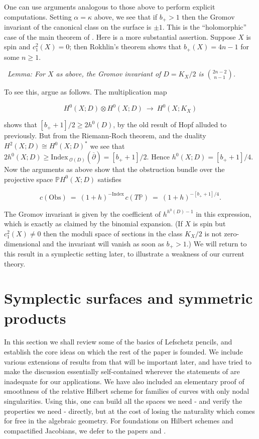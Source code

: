 \documentclass[10pt]{article}
\newcommand{\pp}{\mathbb{P}}
\newcommand{\cdbar}{\overline{\partial}}
\newcommand{\ind}{\mathrm{Index \,}}
\newcounter{Universal}[section]
\renewcommand{\theUniversal}{\thesection.\arabic{Universal}}
\newenvironment{Italic}{\refstepcounter{Universal} \par \vspace{0.5cm}
\noindent {\bf (\theUniversal)}\ \it}{\par \vspace{0.5cm}}
\newenvironment{Lem}{\begin{Italic}{\sc Lemma: }}{\end{Italic}}
\begin{document}
\noindent One can use arguments analogous to those above to perform
explicit computations.  Setting $\alpha = \kappa$ above, we see that
if $b_+ > 1$ then the Gromov
invariant of the canonical class on the surface is $\pm 1$.  This is
the ``holomorphic'' case of the main theorem of \cite{SKDIS}.  Here is a
more substantial assertion.
Suppose $X$ is spin and $c_1 ^2 (X) = 0$; then Rokhlin's theorem shows
that $b_+ (X) = 4n-1$ for some $n \geq 1$.  

\begin{Lem}
For $X$ as above, the Gromov invariant of $D = K_X / 2$ is
  ${{2n-2} \choose {n-1}}$.
\end{Lem}

\noindent To see this, argue as follows. The multiplication map 

$$H^0 (X; D) \otimes H^0 (X; D) \ \rightarrow \ H^0 (X; K_X)$$

\noindent shows that $[b_+ +1]/2 \geq 2h^0 (D)$, by the old result of
Hopf alluded to previously.  But from the Riemann-Roch
theorem, and the duality $H^2 (X;D) \cong H^0 (X;D)^*$ we see that
$2h^0 (X; D) \geq \ind_{\mathcal{O}(D)} (\cdbar) = [b_+ + 1]/2$.
Hence $h^0 (X;D) = [b_+ + 1]/4$.  Now the arguments as above show that 
the obstruction bundle over the projective space $\pp H^0 (X; D)$ satisfies

$$c(\mathrm{Obs}) \ = \ (1+h)^{-\ind} c(T \pp) \ = \ (1+h)^{-[b_+ + 1]/4}.$$

\noindent The Gromov invariant is given by the coefficient of $h^{h^0
  (D) - 1}$ in this expression, which is exactly as claimed by the binomial
  expansion.  (If $X$ is spin but $c_1 ^2 (X) \neq 0$ then the moduli
  space of sections in the class $K_X / 2$ is not zero-dimensional and
  the invariant will vanish as soon as $b_+ > 1$.)  We will return to
  this result in a symplectic setting later, to illustrate a weakness
  of our current theory.



\section{Symplectic surfaces and symmetric products}

In this section we shall review some of the basics of Lefschetz pencils,
and establish the core ideas on which the rest of
the paper is founded.  We include various extensions of results 
from \cite{SKDIS} that will be important later, and have tried to make
the discussion essentially self-contained wherever the statements of
\cite{SKDIS} are inadequate for our applications.  We have also
included an elementary proof of smoothness of the relative Hilbert
scheme for families of curves with only nodal singularities.  Using
this, one can build all the spaces we need - and verify the properties
we need - directly, but at the cost of losing the naturality
which comes for free in the algebraic geometry.  For
foundations on Hilbert schemes and compactified Jacobians, we defer to
the papers \cite{Altman-Kleiman} and \cite{Oda-Seshadri}.
\end{document}
